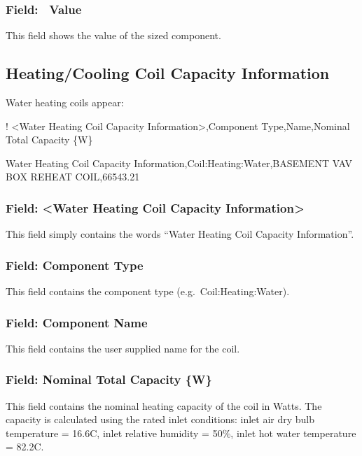 \subsubsection{Field: ~Value}\label{field-value-2}

This field shows the value of the sized component.

\subsection{Heating/Cooling Coil Capacity Information}\label{heatingcooling-coil-capacity-information}

Water heating coils appear:

! \textless{}Water Heating Coil Capacity Information\textgreater{},Component Type,Name,Nominal Total Capacity \{W\}

Water Heating Coil Capacity Information,Coil:Heating:Water,BASEMENT VAV BOX REHEAT COIL,66543.21

\subsubsection{Field: \textless{}Water Heating Coil Capacity Information\textgreater{}}\label{field-water-heating-coil-capacity-information}

This field simply contains the words ``Water Heating Coil Capacity Information''.

\subsubsection{Field: Component Type}\label{field-component-type-1}

This field contains the component type (e.g.~Coil:Heating:Water).

\subsubsection{Field: Component Name}\label{field-component-name-1}

This field contains the user supplied name for the coil.

\subsubsection{Field: Nominal Total Capacity \{W\}}\label{field-nominal-total-capacity-w}

This field contains the nominal heating capacity of the coil in Watts. The capacity is calculated using the rated inlet conditions: inlet air dry bulb temperature = 16.6C, inlet relative humidity = 50\%, inlet hot water temperature = 82.2C.

